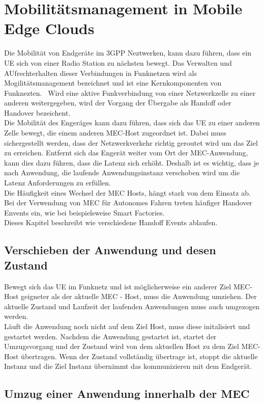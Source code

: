 \documentclass[runningheads]{llncs}
\numberwithin{figure}{section}
\begin{document}
\section{Mobilitätsmanagement in Mobile Edge Clouds}
Die Mobilität von Endgeräte im 3GPP Neztwerken, kann dazu führen, dass ein UE sich von einer 
Radio Station zu nächsten bewegt. Das Verwalten und AUfrechterhalten dieser Verbindungen in Funknetzen wird
als Mogilitätsmanagement bezeichnet und ist eine Kernkomponenten von Funknezten. 
Wird eine aktive Funkverbindung von einer Netzwerkzelle zu einer anderen weitergegeben, wird der Vorgang
der Übergabe als Handoff oder Handover bezeichent.\\
Die Mobilität des Engeräges kann dazu führen, 
dass sich das UE zu einer anderen Zelle bewegt, 
die einem anderen MEC-Host zugeordnet ist. Dabei muss sichergestellt werden, dass der Netzwerkverkehr
richtig geroutet wird um das Ziel zu erreichen.
Entfernt sich das Engerät weiter vom Ort der MEC-Anwendung, 
kann dies dazu führen, dass die Latenz sich erhöht. Deshalb ist es wichtig, dass je nach Anwendung,
die laufende Anwendungsinstanz verschoben wird um die Latenz Anforderungen zu erfüllen. \\
Die Häufigkeit eines Wechsel der MEC Hosts, hängt stark von dem 
Einsatz ab. Bei der Verwendung von MEC für Autonomes Fahren treten häufiger Handover Envents ein, wie bei
beispielsweise Smart Factories.\\
Dieses Kapitel beschreibt wie verschiedene Handoff Events ablaufen.

\subsection{Verschieben der Anwendung und desen Zustand}
Bewegt sich das UE im Funknetz und ist möglicherweise ein anderer Ziel MEC-Host geigneter als der aktuelle
MEC - Host, muss die Anwendung umziehen. Der aktuelle Zustand und Laufzeit der laufenden Anwendungen
muss auch umgezogen werden. \\
Läuft die Anwendung noch nicht auf dem Ziel Host, muss diese initalisiert und gestartet werden.
Nachdem die Anwendung gestartet ist, startet der Umzugsvorgang und der Zustand wird von dem aktuellen 
Host zu dem Ziel MEC-Host übertragen. Wenn der Zustand vollständig übertrage ist, stoppt die aktuelle Instanz
und die Ziel Instanz übernimmt das kommunizieren mit dem Endgerät.
\subsection{Umzug einer Anwendung innerhalb der MEC}
\end{document}
